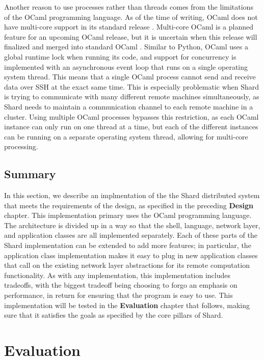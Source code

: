 \documentclass[twoside]{report}
\begin{document}
Another reason to use processes rather than threads comes from the limitations of the OCaml programming language.
As of the time of writing, OCaml does not have multi-core support in its standard release
\cite{dolan2014multicore}.
Multi-core OCaml is a planned feature for an upcoming OCaml release, but it is uncertain when this release will finalized and merged into standard OCaml \cite{sivaramakrishnan2020retrofitting}.
Similar to Python, OCaml uses a global runtime lock when running its code, and support for concurrency is implemented with an asynchronous event loop that runs on a single operating system thread.
This means that a single OCaml process cannot send and receive data over SSH at the exact same time.
This is especially problematic when Shard is trying to communicate with many different remote machines simultaneously, as Shard needs to maintain a communication channel to each remote machine in a cluster.
Using multiple OCaml processes bypasses this restriction, as each OCaml instance can only run on one thread at a time, but each of the different instances can be running on a separate operating system thread, allowing for multi-core processing.

\section{Summary}

In this section, we describe an implmentation of the the Shard distributed system that meets the requirements of the design, as specified in the preceding \textbf{Design} chapter.
This implementation primary uses the OCaml programming language.
The architecture is divided up in a way so that the shell, language, network layer, and application classes are all implemented separately.
Each of these parts of the Shard implementation can be extended to add more features; in particular, the application class implementation makes it easy to plug in new application classes that call on the existing network layer abstractions for its remote computation functionality.
As with any implementation, this implementation includes tradeoffs, with the biggest tradeoff being choosing to forgo an emphasis on performance, in return for ensuring that the program is easy to use.
This implementation will be tested in the \textbf{Evaluation} chapter that follows, making sure that it satisfies the goals as specified by the core pillars of Shard.


\chapter{Evaluation}
\end{document}
